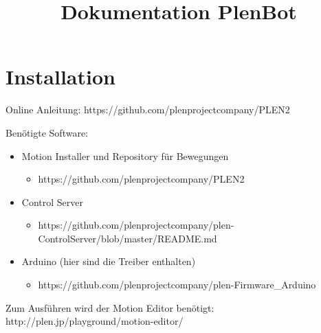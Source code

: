 \documentclass[11pt]{scrartcl}
\begin{document}
\title{Dokumentation PlenBot}
\section{Installation}
\label{sec: Installation}
 Online Anleitung: https://github.com/plenprojectcompany/PLEN2
 
 Benötigte Software:
 \begin{itemize}
 \item Motion Installer und Repository für Bewegungen
 \begin{itemize}
 \item https://github.com/plenprojectcompany/PLEN2
 \end{itemize}
 \item Control Server
 \begin{itemize}
 \item https://github.com/plenprojectcompany/plen-ControlServer/blob/master/README.md
\end{itemize}
\item Arduino (hier sind die Treiber enthalten)
  \begin{itemize}
 \item https://github.com/plenprojectcompany/plen-Firmware_Arduino
\end{itemize}
 \end{itemize}
 Zum Ausführen wird der Motion Editor benötigt: http://plen.jp/playground/motion-editor/
\end{document}
